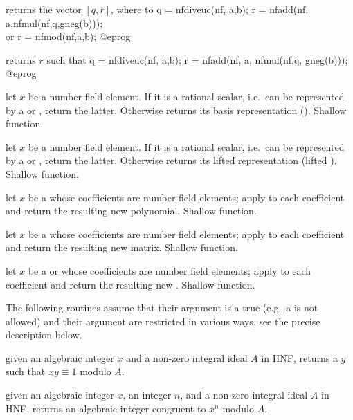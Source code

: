  returns the vector $[q,r]$, where
to
\bprog
  q = nfdiveuc(nf, a,b);
  r = nfadd(nf, a,nfmul(nf,q,gneg(b)));    \\ or r = nfmod(nf,a,b);
@eprog

 returns $r$ such that
\bprog
  q = nfdiveuc(nf, a,b);
  r = nfadd(nf, a, nfmul(nf,q, gneg(b)));
@eprog

 let $x$ be a number field
element. If it is a rational scalar, i.e.~can be represented by a 
or , return the latter. Otherwise returns its basis representation
(). Shallow function.

 let $x$ be a number field
element. If it is a rational scalar, i.e.~can be represented by a 
or , return the latter. Otherwise returns its lifted 
representation (lifted ). Shallow function.

 let $x$ be a  whose coefficients
are number field elements; apply  to each
coefficient and return the resulting new polynomial. Shallow function.

 let $x$ be a  whose coefficients
are number field elements; apply  to each
coefficient and return the resulting new matrix. Shallow function.

 let $x$ be a  or
 whose coefficients
are number field elements; apply  to each
coefficient and return the resulting new . Shallow function.

 The following routines assume that their 
argument is a true  (e.g.~a  is not allowed) and their
argument are restricted in various ways, see the precise description below.

 given an algebraic integer
$x$ and a non-zero integral ideal $A$ in HNF, returns a $y$ such that
$xy \equiv 1$ modulo $A$.

 given an algebraic
integer $x$, an integer $n$, and a non-zero integral ideal $A$ in HNF,
returns an algebraic integer congruent to $x^n$ modulo $A$.

